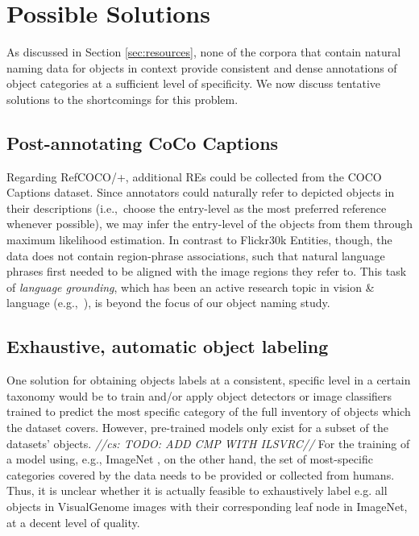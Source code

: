 \documentclass[runningheads]{llncs}
\newcommand{\cs}[1]{\textcolor{PineGreen}{\emph{//cs: #1//}}}
\newcommand{\refcoco}{RefCOCO\xspace}
\newcommand{\flickr}{Flickr30k Entities\xspace}
\begin{document}
\section{Possible Solutions}

As discussed in Section \ref{sec:resources}, none of the corpora that contain natural naming data for objects in context provide consistent and dense annotations of object categories at a sufficient level of specificity. We now discuss tentative solutions to the shortcomings for this problem.

\subsection{Post-annotating CoCo Captions}
Regarding \refcoco/+, additional REs could be collected from the COCO Captions dataset. %
Since annotators could naturally refer to depicted objects in their descriptions (i.e.,~choose the entry-level as the most preferred reference whenever possible), we may infer the entry-level of the objects from them through maximum likelihood estimation. 
%
In contrast to \flickr, though, the data does not contain region-phrase associations,  %
such that natural language phrases first needed to be aligned with the image regions they refer to. 
This task of \textit{language grounding}, which has been an active research topic in vision \& language (e.g.,~\cite{kong2014what,karpathy2015deep,rohrbach2016grounding}), is beyond the focus of our object naming study. 

\subsection{Exhaustive, automatic object labeling}

One solution for obtaining objects labels at a consistent, specific level in a certain taxonomy would be to train and/or apply object detectors or image classifiers trained to predict the most specific category of the full inventory of objects which the dataset covers. 
However, pre-trained models only exist for a subset of the datasets' objects. \cs{TODO: ADD CMP WITH ILSVRC}
For the training of a model using, e.g., ImageNet \cite{imagenet_cvpr09}, on the other hand, the  set of most-specific categories covered by the data needs to be provided or collected from humans. 
Thus, it is unclear whether it is actually feasible to exhaustively label e.g. all objects in VisualGenome images with their corresponding leaf node in ImageNet, at a decent level of quality. 
\end{document}
